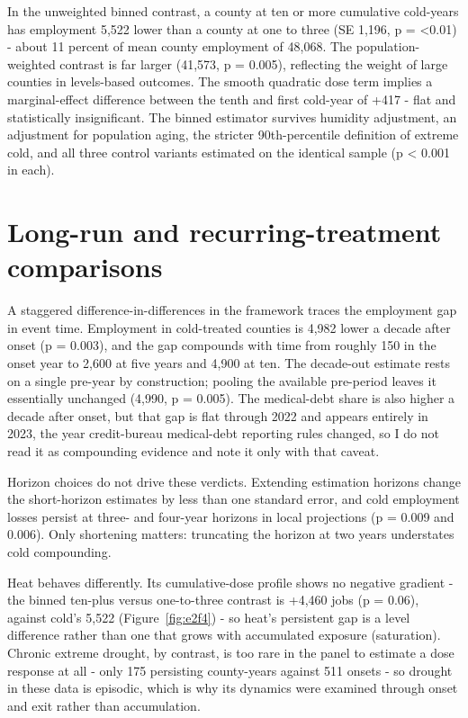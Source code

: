 \documentclass[a4paper,11pt]{article}
\begin{document}
In the unweighted binned contrast, a county at ten or more cumulative cold-years has employment 5,522 lower than a county at one to three (SE 1,196, p = <0.01) - about 11 percent of mean county employment of 48,068. The population-weighted contrast is far larger (\textminus{}41,573, p = 0.005), reflecting the weight of large counties in levels-based outcomes. The smooth quadratic dose term implies a marginal-effect difference between the tenth and first cold-year of +417 - flat and statistically insignificant. The binned estimator survives humidity adjustment, an adjustment for population aging, the stricter 90th-percentile definition of extreme cold, and all three control variants estimated on the identical sample (p < 0.001 in each).

\FloatBarrier
\section{Long-run and recurring-treatment comparisons}

A staggered difference-in-differences in the \citet{callaway2021did} framework traces the employment gap in event time. Employment in cold-treated counties is 4,982 lower a decade after onset (p = 0.003), and the gap compounds  with time from roughly 150 in the onset year to 2,600 at five years and 4,900 at ten. The decade-out estimate rests on a single pre-year by construction; pooling the available pre-period leaves it essentially unchanged (\textminus{}4,990, p = 0.005). The medical-debt share is also higher a decade after onset, but that gap is flat through 2022 and appears entirely in 2023, the year credit-bureau medical-debt reporting rules changed, so I do not read it as compounding evidence and note it only with that caveat.

Horizon choices do not drive these verdicts. Extending estimation horizons change the short-horizon estimates by less than one standard error, and cold employment losses persist at three- and four-year horizons in local projections (p = 0.009 and 0.006). Only shortening matters: truncating the horizon at two years understates cold compounding.

Heat behaves differently. Its cumulative-dose profile shows no negative gradient - the binned ten-plus versus one-to-three contrast is +4,460 jobs (p = 0.06), against cold's \textminus{}5,522 (Figure~\ref{fig:e2f4}) - so heat's persistent gap is a level difference rather than one that grows with accumulated exposure (saturation). Chronic extreme drought, by contrast, is too rare in the panel to estimate a dose response at all - only 175 persisting county-years against 511 onsets - so drought in these data is episodic, which is why its dynamics were examined through onset and exit rather than accumulation.
\end{document}

